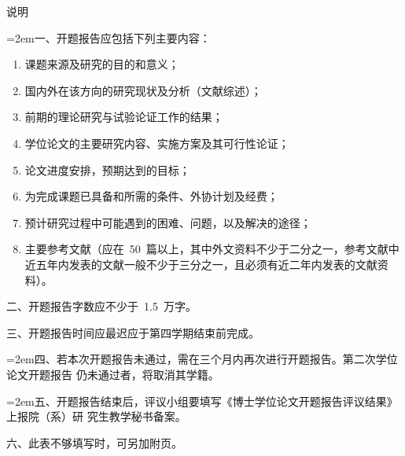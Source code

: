{%
\newpage
\thispagestyle{empty}
\vspace*{2em}
\begin{center}
  \heiti{}说\hspace{3em}明
\end{center}
\vspace*{40pt}
	\renewcommand{\arraystretch}{1.25}
    {\songti{}
    \hangindent=2em\noindent 一、开题报告应包括下列主要内容：
    \begin{enumerate}[leftmargin=36pt]
    \item 课题来源及研究的目的和意义；
    \item 国内外在该方向的研究现状及分析（文献综述）；
    \item 前期的理论研究与试验论证工作的结果；
    \item 学位论文的主要研究内容、实施方案及其可行性论证；
    \item 论文进度安排，预期达到的目标；
    \item 为完成课题已具备和所需的条件、外协计划及经费；
    \item 预计研究过程中可能遇到的困难、问题，以及解决的途径；
    \item 主要参考文献（应在~50~篇以上，其中外文资料不少于二分之一，参考文献中近五年内发表的文献一般不少于三分之一，且必须有近二年内发表的文献资料）。
    \end{enumerate}
    \noindent 二、开题报告字数应不少于~1.5~万字。

    \noindent 三、开题报告时间应最迟应于第四学期结束前完成。

    \hangindent=2em\noindent 四、若本次开题报告未通过，需在三个月内再次进行开题报告。第二次学位论文开题报告
    仍未通过者，将取消其学籍。

    \hangindent=2em\noindent 五、开题报告结束后，评议小组要填写《博士学位论文开题报告评议结果》上报院（系）研
    究生教学秘书备案。

    \noindent 六、此表不够填写时，可另加附页。
    }
	\renewcommand{\arraystretch}{1}
    \clearpage
}
\fi

